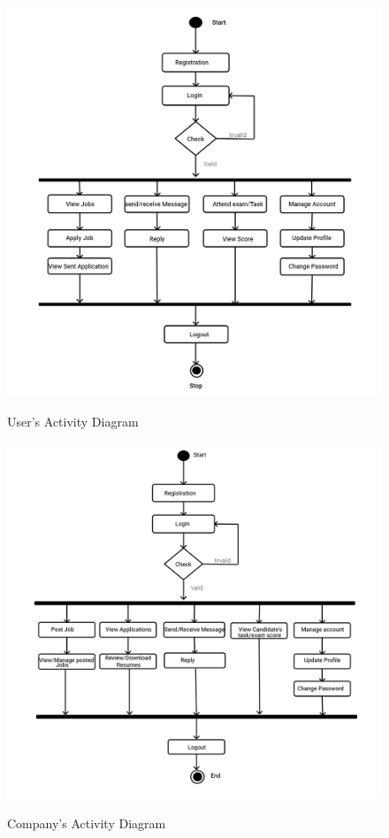 \documentclass[a4paper,12pt]{report}
\begin{document}
\begin{figure}[bph]
	\centering
	\includegraphics[width=.8\linewidth]{img/useractivity}
	\label{fig:useractivity}
    \caption{User's Activity Diagram}
\end{figure}

\pagebreak
{}
\vspace*{12pt}
\begin{figure}[bph]
	\centering
	\includegraphics[width=.8\linewidth]{img/cmpnyactivity}
	\label{fig:companyactivity}
	\caption{Company's Activity Diagram}
\end{figure}
\end{document}
